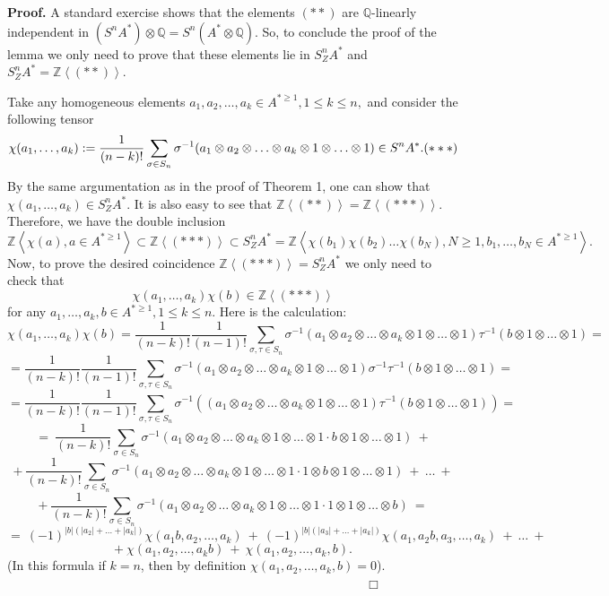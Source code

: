 \documentclass[a4paper,14pt]{article}
\newcommand{\Q}{\mathbb{Q}}
\newcommand{\Z}{\mathbb{Z}}
\begin{document}
\textbf{Proof.} A standard exercise shows that the elements $(**)$ are $\Q$-linearly independent in $(S^n A^*)\otimes \Q = S^n (A^*\otimes \Q)$. So, to conclude the proof of the lemma we only need to prove that these elements lie in $S^n_{Z}A^*$ and $S^n_{Z}A^* = \Z\left<(**)\right>$. 

Take any homogeneous elements $a_1, a_2, \ldots, a_k\in A^{*\ge 1}, 1\le k\le n,$ and consider the following tensor
$$
\chi(a_1,\ldots,a_k) :=  \frac{1}{(n-k)!} \sum_{\sigma\in S_n} \sigma^{-1} (a_1\otimes a_2\otimes\ldots \otimes a_k\otimes 1\otimes \ldots \otimes 1) \in S^n A^*.   \relax{(***)}
$$
By the same argumentation as in the proof of Theorem 1, one can show that $\chi(a_1,\ldots,a_k)\in S^n_{Z}A^*$. It is also easy to see that $\Z\left<(**)\right> = \Z\left<(***)\right>$. Therefore, we have the double inclusion 
$$
\Z\left< \chi(a), a\in A^{*\ge 1} \right> \subset \Z\left<(***)\right> \subset S^n_{Z}A^* = \Z\left< \chi(b_1)\chi(b_2)\ldots \chi(b_N), N\ge 1, b_1,\ldots,b_N\in A^{*\ge 1}  \right>. 
$$ 
Now, to prove the desired coincidence $\Z\left<(***)\right> = S^n_{Z}A^*$ we only need to check that 
$$
\chi(a_1,\ldots,a_k)\chi(b)\in \Z\left<(***)\right>
$$
for any $a_1,\ldots,a_k, b \in A^{*\ge 1}, 1\le k\le n$. Here is the calculation: 
$$
\chi(a_1,\ldots,a_k)\chi(b) = \frac{1}{(n-k)!} \frac{1}{(n-1)!} \sum_{\sigma, \tau \in S_n} \sigma^{-1} (a_1\otimes a_2\otimes\ldots \otimes a_k\otimes 1\otimes \ldots \otimes 1) \tau^{-1}(b\otimes 1\otimes \ldots \otimes 1) =
$$
$$
= \frac{1}{(n-k)!} \frac{1}{(n-1)!} \sum_{\sigma, \tau \in S_n} \sigma^{-1} (a_1\otimes a_2\otimes\ldots \otimes a_k\otimes 1\otimes \ldots \otimes 1) \sigma^{-1} \tau^{-1}(b\otimes 1\otimes \ldots \otimes 1) = 
$$
$$
=  \frac{1}{(n-k)!} \frac{1}{(n-1)!} \sum_{\sigma, \tau \in S_n} \sigma^{-1} ((a_1\otimes a_2\otimes\ldots \otimes a_k\otimes 1\otimes \ldots \otimes 1) \tau^{-1}(b\otimes 1\otimes \ldots \otimes 1)) = 
$$
$$
= \  \frac{1}{(n-k)!} \sum_{\sigma \in S_n}  \sigma^{-1} ( a_1\otimes a_2\otimes\ldots \otimes a_k\otimes 1\otimes \ldots \otimes 1 \cdot  b\otimes 1\otimes \ldots \otimes 1 ) \ +
$$
$$
+ \     \frac{1}{(n-k)!} \sum_{\sigma \in S_n}  \sigma^{-1} ( a_1\otimes a_2\otimes\ldots \otimes a_k\otimes 1\otimes \ldots \otimes 1 \cdot  1\otimes b\otimes 1\otimes \ldots \otimes 1 )  \ +   \  \ldots  \  + 
$$
$$
+ \   \frac{1}{(n-k)!} \sum_{\sigma \in S_n}  \sigma^{-1} ( a_1\otimes a_2\otimes\ldots \otimes a_k\otimes 1\otimes \ldots \otimes 1 \cdot  1\otimes 1\otimes \ldots \otimes b ) \ = 
$$
$$
= \ (-1)^{|b|(|a_2|+\ldots +|a_k|)}\chi(a_1b,a_2,\ldots,a_k) \ + \  (-1)^{|b|(|a_3|+\ldots +|a_k|)}\chi(a_1,a_2b,a_3,\ldots,a_k)  \  +  \  \ldots    \  + 
$$
$$
+   \   \chi(a_1,a_2,\ldots,a_kb)  \  +   \   \chi(a_1,a_2,\ldots,a_k, b).
$$
(In this formula if $k=n$, then by definition $\chi(a_1,a_2,\ldots,a_k, b)=0$).    \ \ \ \ \ \ \ \ \  \ \ \ \  \ \ \ \ \ \ \ \ \ \ \ \   \ \ \ \ \ \ \ \ \  \ \ \ \  \ \ \ \ \ \ \ \ \ \ \ \  \  \  \  \ \ \ \    $\Box$
\end{document}
